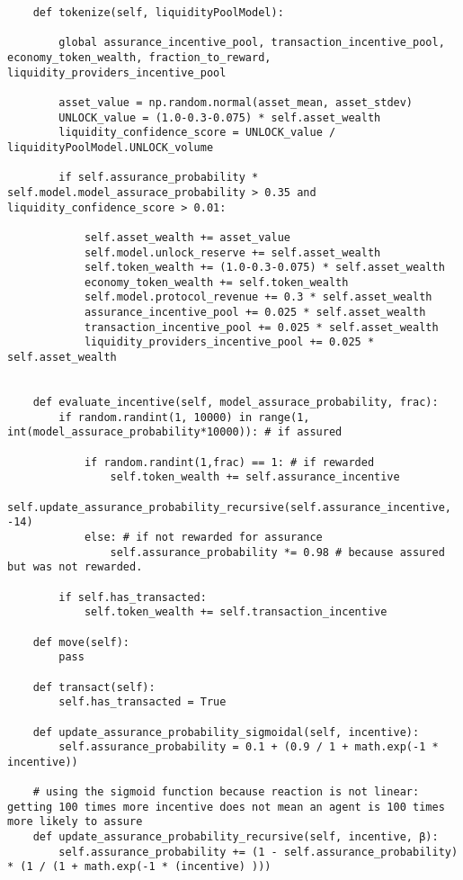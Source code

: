 \documentclass{article}
\begin{document}
\begin{lstlisting}
    def tokenize(self, liquidityPoolModel):

        global assurance_incentive_pool, transaction_incentive_pool, economy_token_wealth, fraction_to_reward, liquidity_providers_incentive_pool

        asset_value = np.random.normal(asset_mean, asset_stdev)
        UNLOCK_value = (1.0-0.3-0.075) * self.asset_wealth
        liquidity_confidence_score = UNLOCK_value / liquidityPoolModel.UNLOCK_volume

        if self.assurance_probability * self.model.model_assurace_probability > 0.35 and liquidity_confidence_score > 0.01: 
        
            self.asset_wealth += asset_value
            self.model.unlock_reserve += self.asset_wealth
            self.token_wealth += (1.0-0.3-0.075) * self.asset_wealth
            economy_token_wealth += self.token_wealth
            self.model.protocol_revenue += 0.3 * self.asset_wealth
            assurance_incentive_pool += 0.025 * self.asset_wealth
            transaction_incentive_pool += 0.025 * self.asset_wealth
            liquidity_providers_incentive_pool += 0.025 * self.asset_wealth

 
    def evaluate_incentive(self, model_assurace_probability, frac):
        if random.randint(1, 10000) in range(1, int(model_assurace_probability*10000)): # if assured

            if random.randint(1,frac) == 1: # if rewarded
                self.token_wealth += self.assurance_incentive
                self.update_assurance_probability_recursive(self.assurance_incentive, -14) 
            else: # if not rewarded for assurance
                self.assurance_probability *= 0.98 # because assured but was not rewarded.
    
        if self.has_transacted:
            self.token_wealth += self.transaction_incentive

    def move(self):
        pass
    
    def transact(self):
        self.has_transacted = True

    def update_assurance_probability_sigmoidal(self, incentive):
        self.assurance_probability = 0.1 + (0.9 / 1 + math.exp(-1 * incentive))
        
    # using the sigmoid function because reaction is not linear: getting 100 times more incentive does not mean an agent is 100 times more likely to assure
    def update_assurance_probability_recursive(self, incentive, β):
        self.assurance_probability += (1 - self.assurance_probability) * (1 / (1 + math.exp(-1 * (incentive) )))


\end{lstlisting}
\end{document}
